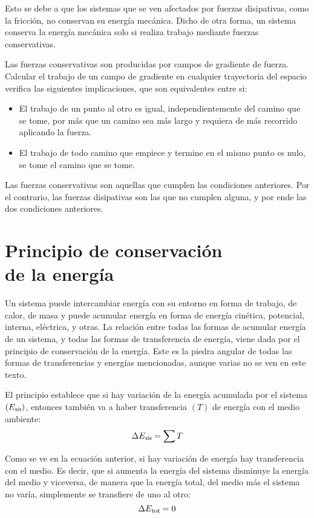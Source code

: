 \documentclass[a5paper,12pt,twoside]{book}
\begin{document}
Esto se debe a que los sistemas que se ven afectados por fuerzas disipativas, como la fricción, no conservan su energía mecánica.
Dicho de otra forma, un sistema conserva la energía mecánica solo si realiza trabajo mediante fuerzas conservativas.

Las fuerzas conservativas son producidas por campos de gradiente de fuerza.
Calcular el trabajo de un campo de gradiente en cualquier trayectoria del espacio verifica las siguientes implicaciones, que son equivalentes entre si:
\begin{itemize}
    \item {} El trabajo de un punto al otro es igual, independientemente del camino que se tome, por más que un camino sea más largo y requiera de más recorrido aplicando la fuerza.
    
    \item {} El trabajo de todo camino que empiece y termine en el mismo punto es nulo, se tome el camino que se tome.
\end{itemize}

Las fuerzas conservativas son aquellas que cumplen las condiciones anteriores.
Por el contrario, las fuerzas disipativas son las que no cumplen alguna, y por ende las dos condiciones anteriores.


\section[Principio de conservación de la energía]{Principio de conservación \\ de la energía}

Un sistema puede intercambiar energía con su entorno en forma de trabajo, de calor, de masa y puede acumular energía en forma de energía cinética, potencial, interna, eléctrica, y otras.
La relación entre todas las formas de acumular energía de un sistema, y todas las formas de transferencia de energía, viene dada por el principio de conservación de la energía.
Este es la piedra angular de todas las formas de transferencias y energías mencionadas, aunque varias no se ven en este texto.

El principio establece que si hay variación de la energía acumulada por el sistema $({{E}_\textsl{{sis}}})$, entonces también va a haber transferencia $(T)$ de energía con el medio ambiente:
\[ \Delta {{E}_\textsl{{sis}}} = \sum T \]

Como se ve en la ecuación anterior, si hay variación de energía hay transferencia con el medio.
Es decir, que si aumenta la energía del sistema disminuye la energía del medio y viceversa, de manera que la energía total, del medio más el sistema no varía, simplemente se transfiere de uno al otro:
\[ \Delta {{E}_\textsl{{tot}}} = 0 \]
\end{document}

